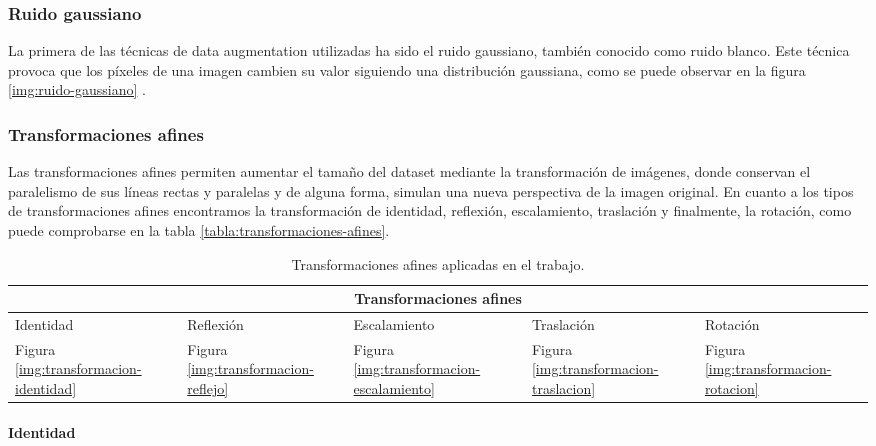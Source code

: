 \subsubsection{Ruido gaussiano}

La primera de las técnicas de data augmentation utilizadas ha sido el ruido gaussiano, también conocido como ruido blanco. 
Este técnica provoca que los píxeles de una imagen cambien su valor siguiendo una distribución gaussiana, como se puede observar en la figura \ref{img:ruido-gaussiano} .

\label{img:ruido-gaussiano}

\subsubsection{Transformaciones afines}

Las transformaciones afines permiten aumentar el tamaño del dataset mediante la transformación de imágenes, donde conservan el paralelismo de sus líneas rectas y paralelas y de alguna forma, simulan una nueva perspectiva de la imagen original.
En cuanto a los tipos de transformaciones afines encontramos la transformación de identidad, reflexión, escalamiento, traslación y finalmente, la rotación, como puede comprobarse en la tabla \ref{tabla:transformaciones-afines}.
\begin{table}
\begin{tabular}{ |p{2cm}|p{1.8cm}|p{2.2cm} |p{2cm}|p{1.8cm}|}
	\hline
	\multicolumn{5}{|c|}{Transformaciones afines}\\ 
	\hline
	Identidad & Reflexión &Escalamiento & Traslación  & Rotación\\
	\hline
	Figura \ref{img:transformacion-identidad} & Figura \ref{img:transformacion-reflejo}     & Figura \ref{img:transformacion-escalamiento} &   Figura \ref{img:transformacion-traslacion} &   Figura \ref{img:transformacion-rotacion}\\
	\hline
\end{tabular}
\caption{Transformaciones afines aplicadas en el trabajo.}
\end{table}
\label{tabla:transformaciones-afines}

\paragraph{Identidad}

